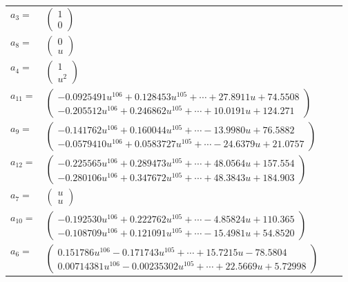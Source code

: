 \documentclass[1p]{elsarticle_modified}
\theoremstyle{definition}
\begin{document}
\begin{tabular}{m{7pt} m{180pt} m{7pt} m{180pt} }
\flushright $a_{3}=$&$\begin{pmatrix}1\\0\end{pmatrix}$ \\
\flushright $a_{8}=$&$\begin{pmatrix}0\\u\end{pmatrix}$ \\
\flushright $a_{4}=$&$\begin{pmatrix}1\\u^2\end{pmatrix}$ \\
\flushright $a_{11}=$&$\begin{pmatrix}-0.0925491 u^{106}+0.128453 u^{105}+\cdots+27.8911 u+74.5508\\-0.205512 u^{106}+0.246862 u^{105}+\cdots+10.0191 u+124.271\end{pmatrix}$ \\
\flushright $a_{9}=$&$\begin{pmatrix}-0.141762 u^{106}+0.160044 u^{105}+\cdots-13.9980 u+76.5882\\-0.0579410 u^{106}+0.0583727 u^{105}+\cdots-24.6379 u+21.0757\end{pmatrix}$ \\
\flushright $a_{12}=$&$\begin{pmatrix}-0.225565 u^{106}+0.289473 u^{105}+\cdots+48.0564 u+157.554\\-0.280106 u^{106}+0.347672 u^{105}+\cdots+48.3843 u+184.903\end{pmatrix}$ \\
\flushright $a_{7}=$&$\begin{pmatrix}u\\u\end{pmatrix}$ \\
\flushright $a_{10}=$&$\begin{pmatrix}-0.192530 u^{106}+0.222762 u^{105}+\cdots-4.85824 u+110.365\\-0.108709 u^{106}+0.121091 u^{105}+\cdots-15.4981 u+54.8520\end{pmatrix}$ \\
\flushright $a_{6}=$&$\begin{pmatrix}0.151786 u^{106}-0.171743 u^{105}+\cdots+15.7215 u-78.5804\\0.00714381 u^{106}-0.00235302 u^{105}+\cdots+22.5669 u+5.72998\end{pmatrix}$ \\

\end{tabular}
\end{document}
